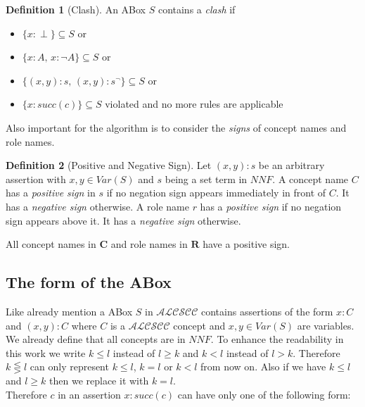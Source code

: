 \documentclass[a4paper,11pt]{scrartcl}
\theoremstyle{break}
\theoremstyle{definition}
\newtheorem{mydef}{Definition}
\begin{document}
\begin{mydef}[Clash]
An ABox $S$ contains a \textit{clash} if
\begin{itemize}
\item $\{x:\perp\}\subseteq S$ or
\item $\{x:A,\,x:\neg A\}\subseteq S$ or
\item $\{(x,y):s,\,(x,y):s^\neg\}\subseteq S$ or
\item $\{x:succ(c)\}\subseteq S$ violated and no more rules are applicable
\end{itemize}
\end{mydef}
Also important for the algorithm is to consider the \textit{signs} of concept names and role names.
\begin{mydef}[Positive and Negative Sign]
Let $(x,y):s$ be an arbitrary assertion with $x,y\in Var(S)$ and $s$ being a set term in $NNF$. A concept name $C$ has a \textit{positive sign} in $s$ if no negation sign appears immediately in front of $C$. It has a \textit{negative sign} otherwise. A role name $r$ has a \textit{positive sign} if no negation sign appears above it. It has a \textit{negative sign} otherwise.
\end{mydef}
All concept names in $\mathbf{C}$ and role names in $\mathbf{R}$ have a positive sign.
\subsection{The form of the ABox}
Like already mention a ABox $S$ in $\mathcal{ALCSCC}$ contains assertions of the form $x:C$ and $(x,y):C$ where $C$ is a $\mathcal{ALCSCC}$ concept and $x,y\in Var(S)$ are variables. We already define that all concepts are in $NNF$. To enhance the readability in this work we write $k\leq l$ instead of $l\geq k$ and $k<l$ instead of $l>k$. Therefore $k\lesseqgtr l$ can only represent $k\leq l$, $k=l$ or $k<l$ from now on. Also if we have $k\leq l$ and $l\geq k$ then we replace it with $k=l$.\\
Therefore $c$ in an assertion $x:succ(c)$ can have only one of the following form:
\end{document}
